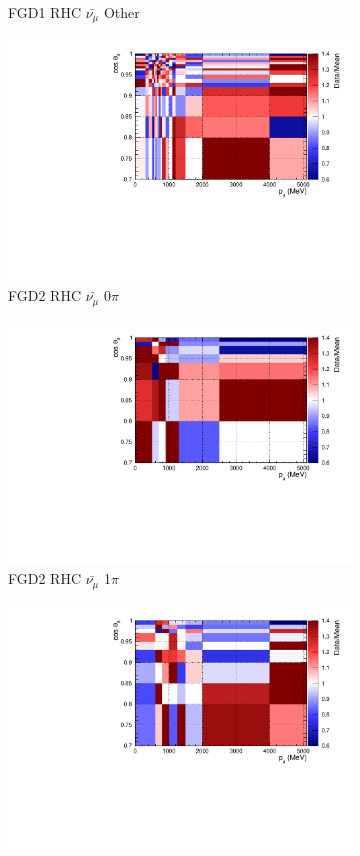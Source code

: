 \begin{figure}
\begin{subfigure}{.32\textwidth}
  \caption{FGD1 RHC $\bar{\nu_{\mu}}$ Other}
  \label{fig:postpred_FGD1_anti-numuCC_other}
\end{subfigure}
\centering
\begin{subfigure}{.32\textwidth}
  \centering
  \includegraphics[width=0.85\linewidth]{figs/postpred_FGD2_anti-numuCC_0pi.pdf}
  \caption{FGD2 RHC $\bar{\nu_{\mu}}$ 0$\pi$}
  \label{fig:postpred_FGD2_anti-numuCC_0pi}
\end{subfigure}
\begin{subfigure}{.32\textwidth}
  \centering
  \includegraphics[width=0.85\linewidth]{figs/postpred_FGD2_anti-numuCC_1pi.pdf}
  \caption{FGD2 RHC $\bar{\nu_{\mu}}$ 1$\pi$}
  \label{fig:postpred_FGD2_anti-numuCC_1pi}
\end{subfigure}
\begin{subfigure}{.32\textwidth}
  \centering
  \includegraphics[width=0.85\linewidth]{figs/postpred_FGD2_anti-numuCC_other.pdf}

\end{subfigure}
\end{figure}

